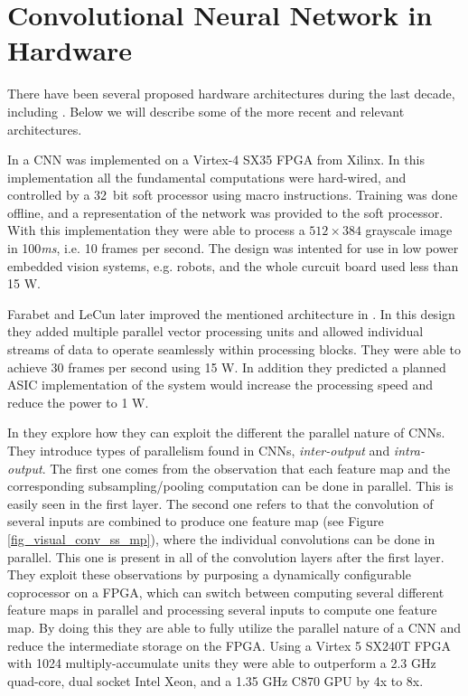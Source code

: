 \section{Convolutional Neural Network in Hardware} \label{sec_related_work_cnn}

There have been several proposed hardware architectures during the last decade, including \cite{Benkrid2002}\cite{Cardells-Tormo2005}\cite{Hui2007}\cite{Savich2007}\cite{Girones2005}. Below we will describe some of the more recent and relevant architectures. 

In \cite{Farabet2009} a CNN was implemented on a Virtex-4 SX35 FPGA from Xilinx. In this implementation all the fundamental computations were hard-wired, and controlled by a 32~bit soft processor using macro instructions. Training was done offline, and a representation of the network was provided to the soft processor. With this implementation they were able to process a $ 512 \times 384 $ grayscale image in 100\textit{ms}, i.e. 10 frames per second. The design was intented for use in low power embedded vision  systems, e.g. robots, and the whole curcuit board used less than 15 W.

Farabet and LeCun later improved the mentioned architecture in \cite{Farabet2010}. In this design they added multiple parallel vector processing units and allowed individual
streams of data to operate seamlessly within processing blocks. They were able to achieve 30 frames per second using 15 W. In addition they predicted a planned ASIC implementation of the system would increase the processing speed and reduce the power to 1 W. 


In \cite{Chakradhar2010} they explore how they can exploit the different the parallel nature of CNNs. They introduce types of parallelism found in CNNs, \textit{inter-output} and \textit{intra-output}. The first one comes from the observation that each feature map and the corresponding subsampling/pooling computation can be done in parallel. This is easily seen in the first layer. The second one refers to that the convolution of several inputs are combined to produce one feature map (see Figure \ref{fig_visual_conv_ss_mp}), where the individual convolutions can be done in parallel. This one is present in all of the convolution layers after the first layer. They exploit these observations by purposing a dynamically configurable coprocessor on a FPGA, which can switch between computing several different feature maps in parallel and processing several inputs to compute one feature map. By doing this they are able to fully utilize the parallel nature of a CNN and reduce the intermediate storage on the FPGA. Using a Virtex 5 SX240T FPGA with 1024 multiply-accumulate units they were able to outperform  a 2.3 GHz quad-core, dual socket Intel Xeon, and a 1.35 GHz C870 GPU by 4x to 8x. 

